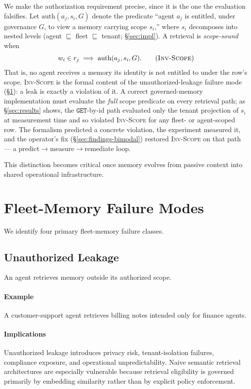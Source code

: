 \documentclass[10pt,twocolumn,letterpaper]{article}
\begin{document}
We make the authorization requirement precise, since it is the one the
evaluation falsifies. Let \(\mathrm{auth}(a_j, s_i, G)\) denote the predicate
``agent \(a_j\) is entitled, under governance \(G\), to view a memory carrying
scope \(s_i\),'' where \(s_i\) decomposes into nested levels (agent
\(\sqsubseteq\) fleet \(\sqsubseteq\) tenant; \S\ref{sec:impl}). A retrieval is
\emph{scope-sound} when
\[
w_i \in r_j \;\Longrightarrow\; \mathrm{auth}(a_j, s_i, G).
\tag{\textsc{Inv-Scope}}
\]
That is, no agent receives a memory its identity is not entitled to under the
row's scope. \textsc{Inv-Scope} is the formal content of the unauthorized-leakage
failure mode (\S\ref{sec:failures}): a leak is exactly a violation of it. A
correct governed-memory implementation must evaluate the \emph{full} scope
predicate on every retrieval path; as \S\ref{sec:results} shows, the
\(\mathtt{GET}\)-by-id path evaluated only the tenant projection of \(s_i\) at
measurement time and so violated \textsc{Inv-Scope} for any fleet- or
agent-scoped row. The formalism predicted a concrete violation, the experiment
measured it, and the operator's fix (\S\ref{sec:findings-bimodal}) restored
\textsc{Inv-Scope} on that path --- a predict\(\to\)measure\(\to\)remediate loop.

This distinction becomes critical once memory evolves from passive context into shared operational infrastructure.

\section{Fleet-Memory Failure Modes}
\label{sec:failures}

We identify four primary fleet-memory failure classes.

\subsection{Unauthorized Leakage}

An agent retrieves memory outside its authorized scope.

\paragraph{Example}
A customer-support agent retrieves billing notes intended only for finance agents.

\paragraph{Implications}
Unauthorized leakage introduces privacy risk, tenant-isolation failures, compliance exposure, and operational unpredictability. Naive semantic retrieval architectures are especially vulnerable because retrieval eligibility is governed primarily by embedding similarity rather than by explicit policy enforcement.
\end{document}

